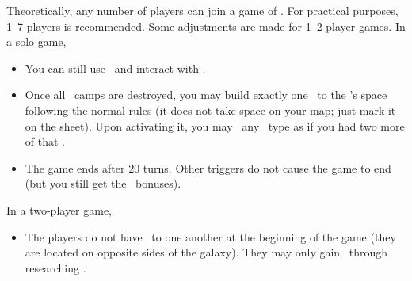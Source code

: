 Theoretically, any number of players can join a game of \asciiplanets.  For practical purposes, 1–7 players is recommended.  Some adjustments are made for 1–2 player games.
\newline\newline
In a solo game,
\begin{itemize}
  \item You can still use \convoys\ and interact with \pirates.
  \item Once all \pirates\ camps are destroyed, you may build exactly one \battleship\ to the \pirate's space following the normal rules (it does not take space on your map; just mark it on the sheet).  Upon activating it, you may \activate\ any \fortification\ type as if you had two more of that \fortification.
  \item The game ends after 20 turns. Other triggers do not cause the game to end (but you still get the \mastery\ bonuses).
\end{itemize}
In a two-player game,
\begin{itemize}
  \item The players do not have \reach\ to one
another at the beginning of the game (they are located on opposite sides of the galaxy). They may only gain \reach\ through researching \warpdrive.
\end{itemize}
